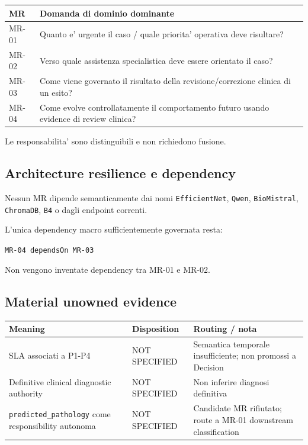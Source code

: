 \documentclass[11pt,a4paper]{article}
\begin{document}
\begin{tabularx}{\textwidth}{L{28mm}Y}
\toprule
\textbf{MR} & \textbf{Domanda di dominio dominante} \\
\midrule
MR-01 & Quanto e' urgente il caso / quale priorita' operativa deve risultare? \\
MR-02 & Verso quale assistenza specialistica deve essere orientato il caso? \\
MR-03 & Come viene governato il risultato della revisione/correzione clinica di un esito? \\
MR-04 & Come evolve controllatamente il comportamento futuro usando evidence di review clinica? \\
\bottomrule
\end{tabularx}

Le responsabilita' sono distinguibili e non richiedono fusione.

\subsection{Architecture resilience e dependency}

Nessun MR dipende semanticamente dai nomi \texttt{EfficientNet}, \texttt{Qwen}, \texttt{BioMistral}, \texttt{ChromaDB}, \texttt{B4} o dagli endpoint correnti.

L'unica dependency macro sufficientemente governata resta:

\begin{center}
\texttt{MR-04 dependsOn MR-03}
\end{center}

Non vengono inventate dependency tra MR-01 e MR-02.

\subsection{Material unowned evidence}

\begin{tabularx}{\textwidth}{L{48mm}L{28mm}Y}
\toprule
\textbf{Meaning} & \textbf{Disposition} & \textbf{Routing / nota} \\
\midrule
SLA associati a P1-P4 & NOT SPECIFIED & Semantica temporale insufficiente; non promossi a Decision \\
Definitive clinical diagnostic authority & NOT SPECIFIED & Non inferire diagnosi definitiva \\
\texttt{predicted\_pathology} come responsibility autonoma & NOT SPECIFIED & Candidate MR rifiutato; route a MR-01 downstream classification \\
\bottomrule
\end{tabularx}
\end{document}
